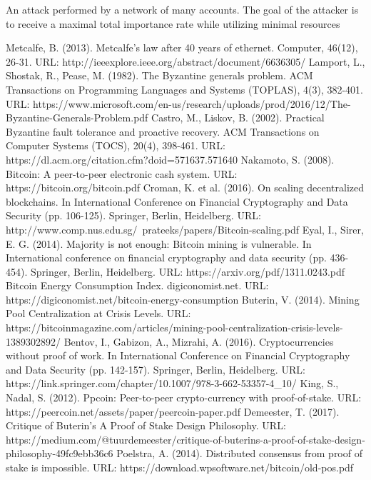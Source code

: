 \documentclass[a4paper,12pt]{article}
\begin{document}
An attack performed by a network of many accounts. The goal of the attacker is to receive a maximal total importance rate while utilizing minimal resources
\begin{thebibliography}{99}
  Metcalfe, B. (2013). Metcalfe's law after 40 years of ethernet. Computer, 46(12), 26-31. URL: http://ieeexplore.ieee.org/abstract/document/6636305/
  Lamport, L., Shostak, R., Pease, M. (1982). The Byzantine generals problem. ACM Transactions on Programming Languages and Systems (TOPLAS), 4(3), 382-401. URL: https://www.microsoft.com/en-us/research/uploads/prod/2016/12/The-Byzantine-Generals-Problem.pdf
  Castro, M., Liskov, B. (2002). Practical Byzantine fault tolerance and proactive recovery. ACM Transactions on Computer Systems (TOCS), 20(4), 398-461. URL: https://dl.acm.org/citation.cfm?doid=571637.571640
  Nakamoto, S. (2008). Bitcoin: A peer-to-peer electronic cash system. URL: https://bitcoin.org/bitcoin.pdf
  Croman, K. et al. (2016). On scaling decentralized blockchains. In International Conference on Financial Cryptography and Data Security (pp. 106-125). Springer, Berlin, Heidelberg. URL: http://www.comp.nus.edu.sg/~prateeks/papers/Bitcoin-scaling.pdf
  Eyal, I., Sirer, E. G. (2014). Majority is not enough: Bitcoin mining is vulnerable. In International conference on financial cryptography and data security (pp. 436-454). Springer, Berlin, Heidelberg. URL: https://arxiv.org/pdf/1311.0243.pdf
  Bitcoin Energy Consumption Index. digiconomist.net. URL: https://digiconomist.net/bitcoin-energy-consumption
  Buterin, V. (2014). Mining Pool Centralization at Crisis Levels. URL: https://bitcoinmagazine.com/articles/mining-pool-centralization-crisis-levels-1389302892/
  Bentov, I., Gabizon, A., Mizrahi, A. (2016). Cryptocurrencies without proof of work. In International Conference on Financial Cryptography and Data Security (pp. 142-157). Springer, Berlin, Heidelberg. URL: https://link.springer.com/chapter/10.1007/978-3-662-53357-4\_10/
  King, S., Nadal, S. (2012). Ppcoin: Peer-to-peer crypto-currency with proof-of-stake. URL: https://peercoin.net/assets/paper/peercoin-paper.pdf
  Demeester, T. (2017). Critique of Buterin’s A Proof of Stake Design Philosophy. URL: https://medium.com/@tuurdemeester/critique-of-buterins-a-proof-of-stake-design-philosophy-49fc9ebb36c6
  Poelstra, A. (2014). Distributed consensus from proof of stake is impossible. URL: https://download.wpsoftware.net/bitcoin/old-pos.pdf

\end{thebibliography}
\end{document}
